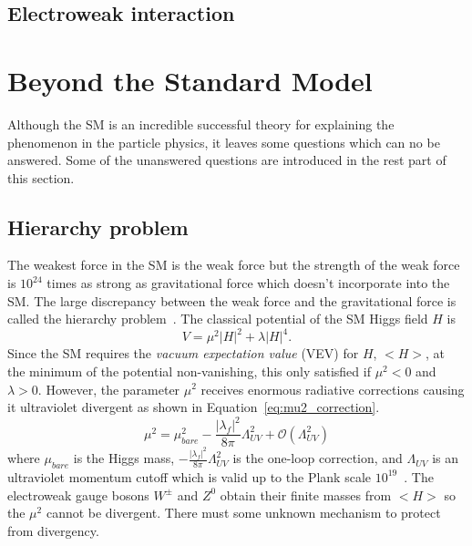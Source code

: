 
\subsection{Electroweak interaction}
\label{subsec:sm_ewk_interaction}


\section{Beyond the Standard Model}
\label{sec:sm_bsm}
Although the SM is an incredible successful theory for explaining the phenomenon in the particle physics, it leaves some questions which can no be answered.
Some of the unanswered questions are introduced in the rest part of this section.


\subsection{Hierarchy problem}
\label{subsec:sm_hierarchy_problem}
The weakest force in the SM is the weak force but the strength of the weak force is $10^{24}$ times as strong as gravitational force which doesn't incorporate into the SM.
The large discrepancy between the weak force and the gravitational force is called the hierarchy problem~\cite{Martin:1997ns}.
The classical potential of the SM Higgs field $H$ is
\begin{equation}
V = \mu^{2} |H|^2 + \lambda |H|^4.
\end{equation}
Since the SM requires the \textit{vacuum expectation value} (VEV) for $H$, $<H>$, at the minimum of the potential non-vanishing, this only satisfied if $\mu^{2} < 0$ and $\lambda > 0$.
However, the parameter $\mu^{2}$ receives enormous radiative corrections causing it ultraviolet divergent as shown in Equation~\ref{eq:mu2_correction}.
\begin{equation}
\mu^{2} = \mu_{bare}^{2} - \frac{|\lambda_{f}|^{2}}{8\pi}\Lambda_{UV}^{2} + \mathcal{O}(\Lambda_{UV}^{2})
\label{eq:mu2_correction}
\end{equation}
where $\mu_{bare}$ is the Higgs mass, $- \frac{|\lambda_{f}|^{2}}{8\pi}\Lambda_{UV}^{2}$ is the one-loop correction, and $\Lambda_{UV}$ is an ultraviolet momentum cutoff which is valid up to the Plank scale $10^{19}$~{\GeV}.
The electroweak gauge bosons $W^{\pm}$ and $Z^{0}$ obtain their finite masses from $<H>$ so the $\mu^{2}$ cannot be divergent.
There must some unknown mechanism to protect from divergency.

